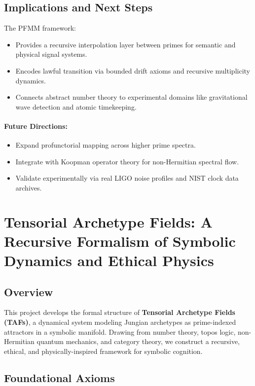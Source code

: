 \documentclass{article}
\theoremstyle{plain}
\begin{document}
\subsection{Implications and Next Steps}
The PFMM framework:
\begin{itemize}
    \item Provides a recursive interpolation layer between primes for semantic and physical signal systems.
    \item Encodes lawful transition via bounded drift axioms and recursive multiplicity dynamics.
    \item Connects abstract number theory to experimental domains like gravitational wave detection and atomic timekeeping.
\end{itemize}

\paragraph{Future Directions:}
\begin{itemize}
    \item Expand profunctorial mapping across higher prime spectra.
    \item Integrate with Koopman operator theory for non-Hermitian spectral flow.
    \item Validate experimentally via real LIGO noise profiles and NIST clock data archives.
\end{itemize}

\section{Tensorial Archetype Fields: A Recursive Formalism of Symbolic Dynamics and Ethical Physics}

\subsection{Overview}

This project develops the formal structure of \textbf{Tensorial Archetype Fields (TAFs)}, a dynamical system modeling Jungian archetypes as prime-indexed attractors in a symbolic manifold. Drawing from number theory, topos logic, non-Hermitian quantum mechanics, and category theory, we construct a recursive, ethical, and physically-inspired framework for symbolic cognition.

\subsection{Foundational Axioms}
\end{document}
